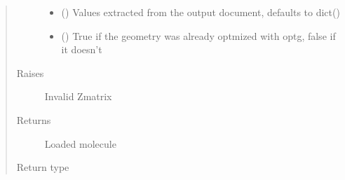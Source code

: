 \documentclass[letterpaper,10pt,english]{sphinxmanual}
\begin{document}
\begin{fulllineitems}
\begin{fulllineitems}
\begin{quote}
\begin{description}
\begin{itemize}
\item {} 
\sphinxAtStartPar
{} (\sphinxstyleliteralemphasis{\sphinxupquote{{[}}}\sphinxstyleliteralemphasis{\sphinxupquote{, }}\sphinxstyleliteralemphasis{\sphinxupquote{{]}}}\sphinxstyleliteralemphasis{\sphinxupquote{, }}) \textendash{} Values extracted from the output document, defaults to dict()

\item {} 
\sphinxAtStartPar
{} (\sphinxstyleliteralemphasis{\sphinxupquote{, }}) \textendash{} True if the geometry was already optmized with optg, false if it doesn’t

\end{itemize}

\item[{Raises}] \leavevmode
\sphinxAtStartPar
{} \textendash{} Invalid Z\sphinxhyphen{}matrix

\item[{Returns}] \leavevmode
\sphinxAtStartPar
Loaded molecule

\item[{Return type}] \leavevmode
\sphinxAtStartPar
{\hyperref[\detokenize{MolOpt.molecular:MolOpt.molecular.molecular.Molecule}]{}}

\end{description}\end{quote}

\end{fulllineitems}



\end{fulllineitems}
\end{document}

